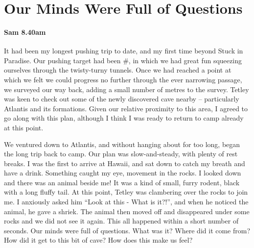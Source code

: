 \begin{marginfigure}
\end{marginfigure}

\section{Our Minds Were Full of Questions}

\paragraph{Sam 8.40am}

It had been my longest pushing trip to date, and my first time beyond Stuck in Paradise. Our pushing target had been \#, in which we had great fun squeezing ourselves through the twisty-turny tunnels. Once we had reached a point at which we felt we could progress no further through the ever narrowing passage, we surveyed our way back, adding a small number of metres to the survey. Tetley was keen to check out some of the newly discovered cave nearby – particularly Atlantis and its formations. Given our relative proximity to this area, I agreed to go along with this plan, although I think I was ready to return to camp already at this point.


We ventured down to Atlantis, and without hanging about for too long, began the long trip back to camp. Our plan was slow-and-steady, with plenty of rest breaks. I was the first to arrive at Hawaii, and sat down to catch my breath and have a drink. Something caught my eye, movement in the rocks. I looked down and there was an animal beside me! It was a kind of small, furry rodent, black with a long fluffy tail. At this point, Tetley was clambering over the rocks to join me. I anxiously asked him “Look at this - What is it?!”, and when he noticed the animal, he gave a shriek. The animal then moved off and disappeared under some rocks and we did not see it again. This all happened within a short number of seconds. Our minds were full of questions. What was it? Where did it come from? How did it get to this bit of cave? How does this make us feel? 

